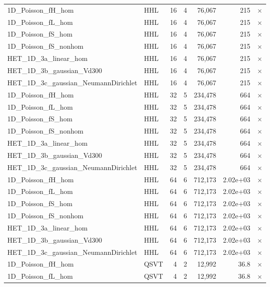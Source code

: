 \begin{table}[htbp]
\begin{tabular}{llrrrrl}
    1D\_Poisson\_fH\_hom & HHL & 16 & 4 & 76,067 & 215 & $\times$ \\
    1D\_Poisson\_fL\_hom & HHL & 16 & 4 & 76,067 & 215 & $\times$ \\
    1D\_Poisson\_fS\_hom & HHL & 16 & 4 & 76,067 & 215 & $\times$ \\
    1D\_Poisson\_fS\_nonhom & HHL & 16 & 4 & 76,067 & 215 & $\times$ \\
    HET\_1D\_3a\_linear\_hom & HHL & 16 & 4 & 76,067 & 215 & $\times$ \\
    HET\_1D\_3b\_gaussian\_Vd300 & HHL & 16 & 4 & 76,067 & 215 & $\times$ \\
    HET\_1D\_3c\_gaussian\_NeumannDirichlet & HHL & 16 & 4 & 76,067 & 215 & $\times$ \\
    1D\_Poisson\_fH\_hom & HHL & 32 & 5 & 234,478 & 664 & $\times$ \\
    1D\_Poisson\_fL\_hom & HHL & 32 & 5 & 234,478 & 664 & $\times$ \\
    1D\_Poisson\_fS\_hom & HHL & 32 & 5 & 234,478 & 664 & $\times$ \\
    1D\_Poisson\_fS\_nonhom & HHL & 32 & 5 & 234,478 & 664 & $\times$ \\
    HET\_1D\_3a\_linear\_hom & HHL & 32 & 5 & 234,478 & 664 & $\times$ \\
    HET\_1D\_3b\_gaussian\_Vd300 & HHL & 32 & 5 & 234,478 & 664 & $\times$ \\
    HET\_1D\_3c\_gaussian\_NeumannDirichlet & HHL & 32 & 5 & 234,478 & 664 & $\times$ \\
    1D\_Poisson\_fH\_hom & HHL & 64 & 6 & 712,173 & 2.02e+03 & $\times$ \\
    1D\_Poisson\_fL\_hom & HHL & 64 & 6 & 712,173 & 2.02e+03 & $\times$ \\
    1D\_Poisson\_fS\_hom & HHL & 64 & 6 & 712,173 & 2.02e+03 & $\times$ \\
    1D\_Poisson\_fS\_nonhom & HHL & 64 & 6 & 712,173 & 2.02e+03 & $\times$ \\
    HET\_1D\_3a\_linear\_hom & HHL & 64 & 6 & 712,173 & 2.02e+03 & $\times$ \\
    HET\_1D\_3b\_gaussian\_Vd300 & HHL & 64 & 6 & 712,173 & 2.02e+03 & $\times$ \\
    HET\_1D\_3c\_gaussian\_NeumannDirichlet & HHL & 64 & 6 & 712,173 & 2.02e+03 & $\times$ \\
    1D\_Poisson\_fH\_hom & QSVT & 4 & 2 & 12,992 & 36.8 & $\times$ \\
    1D\_Poisson\_fL\_hom & QSVT & 4 & 2 & 12,992 & 36.8 & $\times$ \\

\end{tabular}
\end{table}
